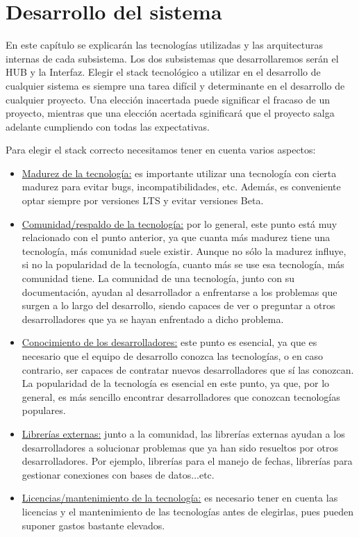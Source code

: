 \chapter{Desarrollo del sistema}
En este capítulo se explicarán las tecnologías utilizadas y las arquitecturas internas de cada subsistema. Los dos subsistemas que desarrollaremos
serán el HUB y la Interfaz.
\label{chap:desarrollosistema}
Elegir el stack tecnológico a utilizar en el desarrollo de cualquier sistema es siempre una tarea difícil y determinante en el desarrollo de 
cualquier proyecto. Una elección inacertada puede significar el fracaso de un proyecto, mientras que una elección acertada sginificará que el 
proyecto salga adelante cumpliendo con todas las expectativas.
\par
Para elegir el stack correcto necesitamos tener en cuenta varios aspectos:
\begin{itemize}
\item\underline{Madurez de la tecnología:} es importante utilizar una tecnología con cierta madurez para evitar bugs, incompatibilidades, etc. Además, es
conveniente optar siempre por versiones LTS y evitar versiones Beta.
\item\underline{Comunidad/respaldo de la tecnología:} por lo general, este punto está muy relacionado con el punto anterior, ya que cuanta más madurez tiene
una tecnología, más comunidad suele existir. Aunque no sólo la madurez influye, si no la popularidad de la tecnología, cuanto más se use esa tecnología,
más comunidad tiene. La comunidad de una tecnología, junto con su documentación, ayudan al desarrollador a enfrentarse a los problemas que surgen a lo
largo del desarrollo, siendo capaces de ver o preguntar a otros desarrolladores que ya se hayan enfrentado a dicho problema.
\item\underline{Conocimiento de los desarrolladores:} este punto es esencial, ya que es necesario que el equipo de desarrollo conozca las tecnologías, o en caso
contrario, ser capaces de contratar nuevos desarrolladores que sí las conozcan. La popularidad de la tecnología es esencial en este punto, ya que, por 
lo general, es más sencillo encontrar desarrolladores que conozcan tecnologías populares.
\item\underline{Librerías externas:} junto a la comunidad, las librerías externas ayudan a los desarrolladores a solucionar problemas que ya han sido resueltos
por otros desarrolladores. Por ejemplo, librerías para el manejo de fechas, librerías para gestionar conexiones con bases de datos...etc.
\item\underline{Licencias/mantenimiento de la tecnología:} es necesario tener en cuenta las licencias y el mantenimiento de las tecnologías antes de elegirlas,
pues pueden suponer gastos bastante elevados.
\end{itemize}

